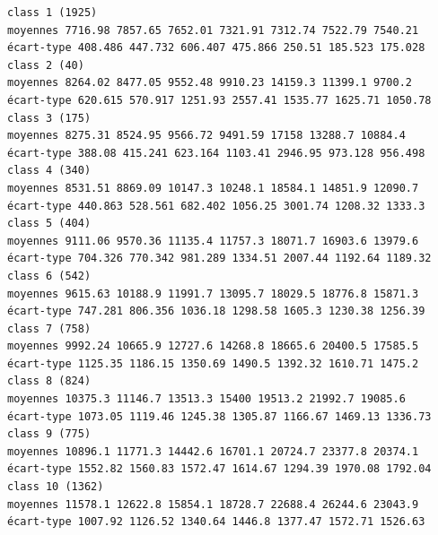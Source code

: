 \documentclass[land,article,submit,pdftex,moreauthors]{Definitions/mdpi}
\begin{document}
\begin{scriptsize}
\begin{verbatim}
class 1 (1925)
moyennes 7716.98 7857.65 7652.01 7321.91 7312.74 7522.79 7540.21
écart-type 408.486 447.732 606.407 475.866 250.51 185.523 175.028
class 2 (40)
moyennes 8264.02 8477.05 9552.48 9910.23 14159.3 11399.1 9700.2
écart-type 620.615 570.917 1251.93 2557.41 1535.77 1625.71 1050.78
class 3 (175)
moyennes 8275.31 8524.95 9566.72 9491.59 17158 13288.7 10884.4
écart-type 388.08 415.241 623.164 1103.41 2946.95 973.128 956.498
class 4 (340)
moyennes 8531.51 8869.09 10147.3 10248.1 18584.1 14851.9 12090.7
écart-type 440.863 528.561 682.402 1056.25 3001.74 1208.32 1333.3
class 5 (404)
moyennes 9111.06 9570.36 11135.4 11757.3 18071.7 16903.6 13979.6
écart-type 704.326 770.342 981.289 1334.51 2007.44 1192.64 1189.32
class 6 (542)
moyennes 9615.63 10188.9 11991.7 13095.7 18029.5 18776.8 15871.3
écart-type 747.281 806.356 1036.18 1298.58 1605.3 1230.38 1256.39
class 7 (758)
moyennes 9992.24 10665.9 12727.6 14268.8 18665.6 20400.5 17585.5
écart-type 1125.35 1186.15 1350.69 1490.5 1392.32 1610.71 1475.2
class 8 (824)
moyennes 10375.3 11146.7 13513.3 15400 19513.2 21992.7 19085.6
écart-type 1073.05 1119.46 1245.38 1305.87 1166.67 1469.13 1336.73
class 9 (775)
moyennes 10896.1 11771.3 14442.6 16701.1 20724.7 23377.8 20374.1
écart-type 1552.82 1560.83 1572.47 1614.67 1294.39 1970.08 1792.04
class 10 (1362)
moyennes 11578.1 12622.8 15854.1 18728.7 22688.4 26244.6 23043.9
écart-type 1007.92 1126.52 1340.64 1446.8 1377.47 1572.71 1526.63


\end{verbatim}
\end{scriptsize}
\end{document}

